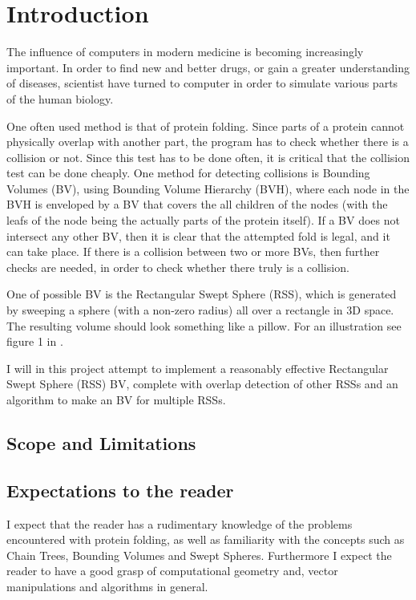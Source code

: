 
\section{Introduction}
\label{introduction}
The influence of computers in modern medicine is becoming increasingly important. In order to find new and better drugs, or gain a greater understanding of diseases, scientist have turned to computer in order to simulate various parts of the human biology.

One often used method is that of protein folding. Since parts of a protein cannot physically overlap with another part, the program has to check whether there is a collision or not. Since this test has to be done often, it is critical that the collision test can be done cheaply. 
One method for detecting collisions is Bounding Volumes (BV), using Bounding Volume Hierarchy (BVH), where each node in the BVH is enveloped by a BV that covers the all children of the nodes (with the leafs of the node being the actually parts of the protein itself). If a BV does not intersect any other BV, then it is clear that the attempted fold is legal, and it can take place. If there is a collision between two or more BVs, then further checks are needed, in order to check whether there truly is a collision.

One of possible BV is the Rectangular Swept Sphere (RSS), which is generated by sweeping a sphere (with a non-zero radius) all over a rectangle in 3D space. The resulting volume should look something like a pillow. For an illustration see figure 1 in \cite{Larsen99fastproximity}.

I will in this project attempt to implement a reasonably effective Rectangular Swept Sphere (RSS) BV, complete with overlap detection of other RSSs and an algorithm to make an BV for multiple RSSs.

\subsection{Scope and Limitations}
\label{scope}

\subsection{Expectations to the reader}
I expect that the reader has a rudimentary knowledge of the problems encountered with protein folding, as well as familiarity with the concepts such as Chain Trees, Bounding Volumes and Swept Spheres. Furthermore I expect the reader to have a good grasp of computational geometry and, vector manipulations and algorithms in general.

